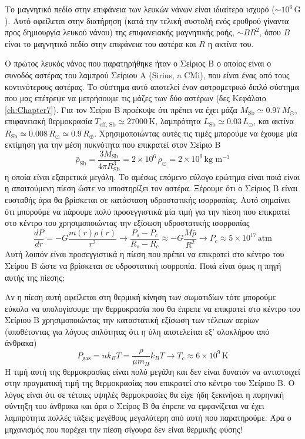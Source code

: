  Το μαγνητικό πεδίο στην επιφάνεια των λευκών νάνων είναι ιδιαίτερα ισχυρό ($\sim 10^6\,\text{G}$). Αυτό οφείλεται στην διατήρηση (κατά την τελική συστολή ενός ερυθρού γίναντα προς δημιουργία λευκού νάνου) της επιφανειακής μαγνητικής ροής, $\sim BR^2$, όπου $B$ είναι το μαγνητικό πεδίο στην επιφάνεια του αστέρα και $R$ η ακτίνα του.
 
 Ο πρώτος λευκός νάνος που παρατηρήθηκε ήταν ο Σείριος Β ο οποίος είναι ο συνοδός αστέρας του λαμπρού Σείριου Α (Sirius, a CMi), που είναι ένας από τους κοντινότερους αστέρας. Το σύστημα αυτό αποτελεί έναν αστρομετρικό διπλό σύστημα που μας επέτρεψε να μετρήσουμε τις μάζες των δύο αστέρων (δες Κεφάλαιο\,\ref{ch:Chapter7}). Για τον Σείριο Β προέκυψε ότι πρέπει να έχει μάζα $M_{\text{Sb}} \simeq 0.97\,M_\odot$, επιφανειακή θερμοκρασία $T_{\text{eff, Sb}} \simeq 27000\,\text{K}$, λαμπρότητα $L_{\text{Sb}} \simeq 0.03\,L_\odot$, και ακτίνα $R_{\text{Sb}} \simeq 0.008\,R_\odot \simeq 0.9\,R_\oplus$. Χρησιμοποιώντας αυτές τις τιμές μπορούμε να έχουμε μία εκτίμηση για την μέση πυκνότητα που επικρατεί στον Σείριο Β
 $$\bar{\rho}_{\text{Sb}} = \frac{3M_{\text{Sb}}}{4\pi R_{\text{Sb}}^3} = 2 \times 10^6\,\rho_\odot = 2 \times 10^9\,\text{kg m$^{-3}$}$$η οποία είναι εξαιρετικά μεγάλη. Το αμέσως επόμενο εύλογο ερώτημα είναι ποιά είναι η απαιτούμενη πίεση ώστε να υποστηρίξει τον αστέρα. Ξέρουμε ότι ο Σείριος Β είναι ευσταθής άρα θα βρίσκεται σε κατάσταση υδροστατικής ισορροπίας. Αυτό σημαίνει ότι μπορούμε να πάρουμε πολύ προσεγγιστικά μία τιμή για την πίεση που επικρατεί στο κέντρο του χρησιμοποιώντας την εξίσωση υδροστατικής ισορροπίας
 $$\frac{dP}{dr} = - G \frac{m(r) \rho(r)}{r^2} \longrightarrow \frac{P_s - P_c}{R_s - R_c} \approx -G \frac{M \bar{\rho}}{R^2} \rightarrow P_c \approx 5 \times 10^{17}\,\text{atm}$$Αυτή λοιπόν είναι προσεγγιστικά η πίεση που πρέπει να επικρατεί στο κέντρο του Σείρου Β ώστε να βρίσκεται σε υδροστατική ισορροπία. Ποιά είναι όμως η πηγή αυτής της πίεσης;
 
 Αν η πίεση αυτή οφείλεται στη θερμική κίνηση των σωματιδίων τότε μπορούμε εύκολα να υπολογίσουμε την θερμοκρασία που θα έπρεπε να επικρατεί στο κέντρο του Σείριου Β χρησιμοποιώντας την καταστατική εξίσωση των τέλειων αερίων (υποθέτοντας για λόγους απλότητας ότι η ύλη αποτελείται εξ' ολοκλήρου από άνθρακα)
 $$P_{\text{gas}} = n k_B T = \frac{\rho}{\mu m_H} k_B T \longrightarrow T_c \approx 6 \times 10^9\,\text{K}$$Η τιμή αυτή της θερμοκρασίας είναι πολύ μεγάλη και δεν είναι δυνατόν να αντιστοιχεί στην πραγματική τιμή της θερμοκρασίας που επικρατεί στο κέντρο του Σείριου Β. Ο λόγος είναι ότι σε τέτοιες υψηλές θερμοκρασίες θα είχε ήδη ξεκινήσει η πυρηνική σύντηξη του άνθρακα και άρα ο Σείρος Β θα έπρεπε να εμφανίζεται να έχει λαμπρότητα πολλές τάξεις μεγέθους μεγαλύτερη από αυτή που παρατηρούμε. Άρα ο μηχανισμός που παρέχει την πίεση σίγουρα δεν είναι θερμικής φύσης!
 
